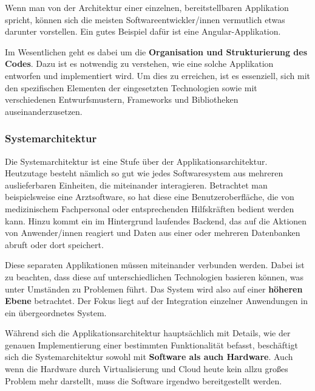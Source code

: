     Wenn man von der Architektur einer einzelnen, bereitstellbaren Applikation spricht, können sich die meisten Softwareentwickler/innen vermutlich etwas darunter vorstellen. Ein gutes Beispiel dafür ist eine Angular-Applikation.

    Im Wesentlichen geht es dabei um die \textbf{Organisation und Strukturierung des Codes}. 
    Dazu ist es notwendig zu verstehen, wie eine solche Applikation entworfen und implementiert wird. 
    Um dies zu erreichen, ist es essenziell, sich mit den spezifischen Elementen der eingesetzten Technologien sowie mit verschiedenen Entwurfsmustern, Frameworks und Bibliotheken auseinanderzusetzen.
    \cite{EA:Web01}



    \subsubsection{Systemarchitektur} \label{Softwarearchitektur}

    Die Systemarchitektur ist eine Stufe über der Applikationsarchitektur. Heutzutage besteht nämlich so gut wie jedes Softwaresystem aus mehreren auslieferbaren Einheiten, die miteinander interagieren. 
    Betrachtet man beispielsweise eine Arztsoftware, so hat diese eine Benutzeroberfläche, die von medizinischem Fachpersonal oder entsprechenden Hilfskräften bedient werden kann. Hinzu kommt ein im Hintergrund laufendes Backend, das auf die Aktionen von Anwender/innen reagiert und Daten aus einer oder mehreren Datenbanken abruft oder dort speichert.

    Diese separaten Applikationen müssen miteinander verbunden werden. Dabei ist zu beachten, dass diese auf unterschiedlichen Technologien basieren können, was unter Umständen zu Problemen führt. Das System wird also auf einer \textbf{höheren Ebene} betrachtet. 
    Der Fokus liegt auf der Integration einzelner Anwendungen in ein übergeordnetes System.

    Während sich die Applikationsarchitektur hauptsächlich mit Details, wie der genauen Implementierung einer bestimmten Funktionalität befasst, beschäftigt sich die Systemarchitektur sowohl mit \textbf{Software als auch Hardware}.
    Auch wenn die Hardware durch Virtualisierung und Cloud heute kein allzu großes Problem mehr darstellt, muss die Software irgendwo bereitgestellt werden.
    \cite{EA:Web01}



